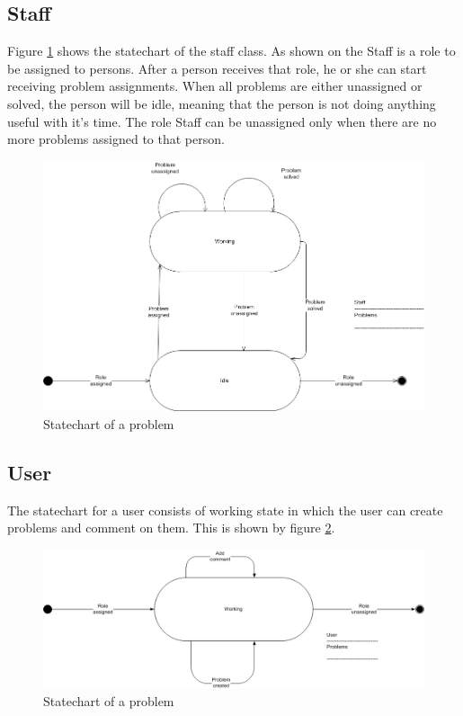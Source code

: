 \subsection{Staff}
Figure \ref{fig:Klasse_diagram_staff} shows the statechart of the staff class. As shown on the Staff is a role to be assigned to persons. After a person receives that role, he or she can start receiving problem assignments. When all problems are either unassigned or solved, the person will be idle, meaning that the person is not doing anything useful with it's time. The role Staff can be unassigned only when there are no more problems assigned to that person.
\begin{figure}[H]
\begin{center}
\includegraphics[width=1\textwidth]{input/problem_domain_analysis/Klassediagram_staff.jpg}
\caption{Statechart of a problem}
\label{fig:Klasse_diagram_staff}
\end{center}
\end{figure}

\subsection{User}
The statechart for a user consists of working state in which the user can create problems and comment on them. This is shown by figure \ref{fig:Klasse_diagram_user}.
\begin{figure}[H]
\begin{center}
\includegraphics[width=1\textwidth]{input/problem_domain_analysis/Klassediagram_user.jpg}
\caption{Statechart of a problem}
\label{fig:Klasse_diagram_user}
\end{center}
\end{figure}

